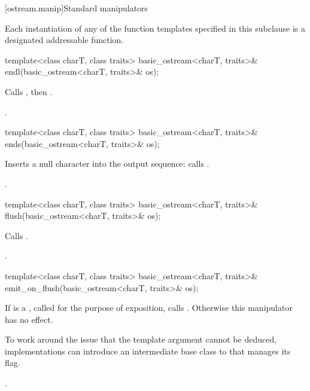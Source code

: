 [ostream.manip]{Standard manipulators}

\pnum
Each instantiation of any of the function templates
specified in this subclause
is a designated addressable function.

\begin{indexed}{}
\begin{itemdecl}
template<class charT, class traits>
  basic_ostream<charT, traits>& endl(basic_ostream<charT, traits>& os);
\end{itemdecl}
\end{indexed}

\begin{itemdescr}
\pnum
\effects
Calls
,
then
.

\pnum
\returns
{}.
\end{itemdescr}

%
\begin{itemdecl}
template<class charT, class traits>
  basic_ostream<charT, traits>& ends(basic_ostream<charT, traits>& os);
\end{itemdecl}

\begin{itemdescr}
\pnum
\effects
Inserts a null character into the output sequence:
calls
.

\pnum
\returns
{}.
\end{itemdescr}

%
\begin{itemdecl}
template<class charT, class traits>
  basic_ostream<charT, traits>& flush(basic_ostream<charT, traits>& os);
\end{itemdecl}

\begin{itemdescr}
\pnum
\effects
Calls
.

\pnum
\returns
{}.
\end{itemdescr}

%
\begin{itemdecl}
template<class charT, class traits>
  basic_ostream<charT, traits>& emit_on_flush(basic_ostream<charT, traits>& os);
\end{itemdecl}

\begin{itemdescr}
\pnum
\effects
If  is a
,
called  for the purpose of exposition,
calls .
Otherwise this manipulator has no effect.
\begin{note}
To work around the issue that the
 template argument cannot be deduced,
implementations can introduce an intermediate base class
to  that manages its  flag.
\end{note}

\pnum
\returns
{}.
\end{itemdescr}

